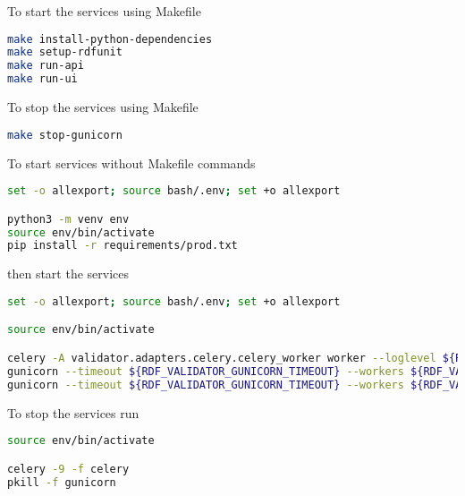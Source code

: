 To start the services using Makefile

\begin{lstlisting}[language=bash,]
make install-python-dependencies
make setup-rdfunit
make run-api
make run-ui
\end{lstlisting}

To stop the services using Makefile

\begin{lstlisting}[language=bash,]
make stop-gunicorn
\end{lstlisting}

To start services without Makefile commands

\begin{lstlisting}[language=bash,]
set -o allexport; source bash/.env; set +o allexport

python3 -m venv env
source env/bin/activate
pip install -r requirements/prod.txt
\end{lstlisting}

then start the services

\begin{lstlisting}[language=bash,]
set -o allexport; source bash/.env; set +o allexport

source env/bin/activate

celery -A validator.adapters.celery.celery_worker worker --loglevel ${RDF_VALIDATOR_LOG_LEVEL} --logfile ${RDF_VALIDATOR_CELERY_LOGS} --detach
gunicorn --timeout ${RDF_VALIDATOR_GUNICORN_TIMEOUT} --workers ${RDF_VALIDATOR_GUNICORN_API_WORKERS} --bind 0.0.0.0:${RDF_VALIDATOR_API_PORT} --reload validator.entrypoints.api.run:app --log-file ${RDF_VALIDATOR_API_LOGS} --log-level ${RDF_VALIDATOR_LOG_LEVEL} --daemon
gunicorn --timeout ${RDF_VALIDATOR_GUNICORN_TIMEOUT} --workers ${RDF_VALIDATOR_GUNICORN_UI_WORKERS} --bind 0.0.0.0:${RDF_VALIDATOR_UI_PORT} --reload validator.entrypoints.ui.run:app --log-file ${RDF_VALIDATOR_UI_LOGS} --log-level ${RDF_VALIDATOR_LOG_LEVEL} --daemon
\end{lstlisting}

To stop the services run

\begin{lstlisting}[language=bash,]
source env/bin/activate

celery -9 -f celery
pkill -f gunicorn
\end{lstlisting}